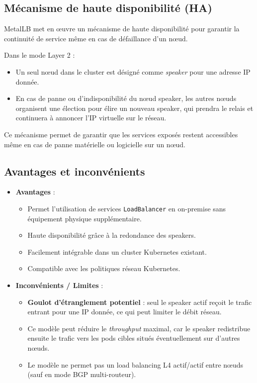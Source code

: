 \subsection{Mécanisme de haute disponibilité (HA)}

MetalLB met en œuvre un mécanisme de haute disponibilité pour garantir la continuité de service même en cas de défaillance d’un nœud.

Dans le mode Layer 2 :
\begin{itemize}
	\item Un seul nœud dans le cluster est désigné comme \emph{speaker} pour une adresse IP donnée.
	\item En cas de panne ou d’indisponibilité du nœud speaker, les autres nœuds organisent une élection pour élire un nouveau speaker, qui prendra le relais et continuera à annoncer l’IP virtuelle sur le réseau.
\end{itemize}

Ce mécanisme permet de garantir que les services exposés restent accessibles même en cas de panne matérielle ou logicielle sur un nœud.

\subsection{Avantages et inconvénients}

\begin{itemize}
	\item \textbf{Avantages} :
	      \begin{itemize}
		      \item Permet l’utilisation de services \texttt{LoadBalancer} en on-premise sans équipement physique supplémentaire.
		      \item Haute disponibilité grâce à la redondance des speakers.
		      \item Facilement intégrable dans un cluster Kubernetes existant.
		      \item Compatible avec les politiques réseau Kubernetes.
	      \end{itemize}

	\item \textbf{Inconvénients / Limites} :
	      \begin{itemize}
		      \item \textbf{Goulot d’étranglement potentiel} : seul le speaker actif reçoit le trafic entrant pour une IP donnée, ce qui peut limiter le débit réseau.
		      \item Ce modèle peut réduire le \emph{throughput} maximal, car le speaker redistribue ensuite le trafic vers les pods cibles situés éventuellement sur d'autres nœuds.
		      \item Le modèle ne permet pas un load balancing L4 actif/actif entre nœuds (sauf en mode BGP multi-routeur).
	      \end{itemize}
\end{itemize}

